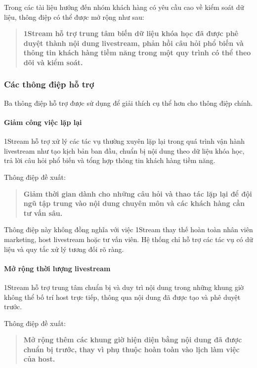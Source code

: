 Trong các tài liệu hướng đến nhóm khách hàng có yêu cầu cao về kiểm soát dữ liệu, thông điệp có thể được mở rộng như sau:

\begin{quote}
\centering
\textbf{1Stream hỗ trợ trung tâm biến dữ liệu khóa học đã được phê duyệt thành nội dung livestream, phản hồi câu hỏi phổ biến và thông tin khách hàng tiềm năng trong một quy trình có thể theo dõi và kiểm soát.}
\end{quote}

\subsubsection{Các thông điệp hỗ trợ}

Ba thông điệp hỗ trợ được sử dụng để giải thích cụ thể hơn cho thông điệp chính.

\paragraph{Giảm công việc lặp lại}

1Stream hỗ trợ xử lý các tác vụ thường xuyên lặp lại trong quá trình vận hành livestream như tạo kịch bản ban đầu, chuẩn bị nội dung theo dữ liệu khóa học, trả lời câu hỏi phổ biến và tổng hợp thông tin khách hàng tiềm năng.

Thông điệp đề xuất:

\begin{quote}
\textbf{Giảm thời gian dành cho những câu hỏi và thao tác lặp lại để đội ngũ tập trung vào nội dung chuyên môn và các khách hàng cần tư vấn sâu.}
\end{quote}

Thông điệp này không đồng nghĩa với việc 1Stream thay thế hoàn toàn nhân viên marketing, host livestream hoặc tư vấn viên. Hệ thống chỉ hỗ trợ các tác vụ có dữ liệu và quy tắc xử lý tương đối rõ ràng.

\paragraph{Mở rộng thời lượng livestream}

1Stream hỗ trợ trung tâm chuẩn bị và duy trì nội dung trong những khung giờ không thể bố trí host trực tiếp, thông qua nội dung đã được tạo và phê duyệt trước.

Thông điệp đề xuất:

\begin{quote}
\textbf{Mở rộng thêm các khung giờ hiện diện bằng nội dung đã được chuẩn bị trước, thay vì phụ thuộc hoàn toàn vào lịch làm việc của host.}
\end{quote}

